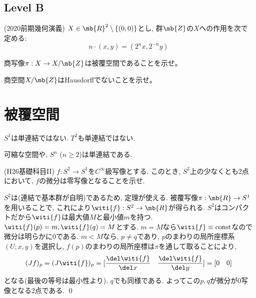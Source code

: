 \subsection{Level B}
\begin{prob} (2020前期幾何演義)
$X\in \mb{R}^{2}\setminus{\{ (0,0)\}}$とし, 群$\mb{Z}$の$X$への作用を次で定める:
\[n\cdot (x,y) = (2^{n}x, 2^{-n}y)\]
\ben
\item 商写像$\pi:X\to X/\mb{Z}$は被覆空間であることを示せ。
\item 商空間$X/\mb{Z}$はHausdorffでないことを示せ。
\een
\end{prob}

\newpage 
\section{被覆空間}

\begin{eg}
\ben 
\item $S^1$は単連結ではない. $T^2$も単連結ではない. 
\item 可縮な空間や, $S^n$ ($n\geq 2$)は単連結である. 
\een
\end{eg}

\begin{egprob} (H26基礎科目II)
$f:S^2\to S^1$を$C^{\infty}$級写像とする. このとき, $S^2$上の少なくとも2点において, $f$の微分は零写像となることを示せ. 
\end{egprob}

\begin{egans}
$S^2$は(連結で基本群が自明)であるため, 定理が使える. 
被覆写像$\pi:\mb{R}\to S^1$を用いることで, これにより$\witi{f} : S^2\to \mb{R}$が得られる. $S^2$はコンパクトだから$\witi{f}$は最大値$M$と最小値$m$を持つ. $\witi{f}(p) = m, \witi{f}(q)  = M$とする. $m=M$なら$\witi{f} \equiv \text{const}$なので微分は明らかに0である. $m<M$なら, $p\neq q$であり, $p$のまわりの局所座標系$(U;x,y)$を選択し, $f(p)$のまわりの局所座標は$\pi$を通して取ることにより, 
\[(Jf)_{p} = (J\witi{f})_{p} = [\dfrac{\del \witi{f}}{\del x} \quad \dfrac{\del \witi{f}}{\del y}] = [0\quad 0]\]
となる(最後の等号は最小性より). $q$でも同様である. よってこの$p,q$が微分が0写像となる2点である. \qed  
\end{egans}

